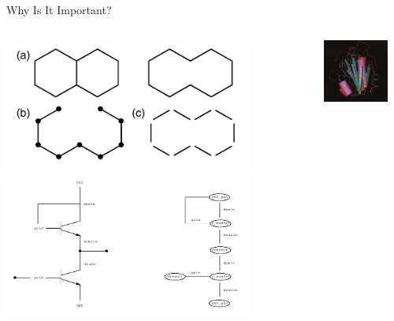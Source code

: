 \documentclass{beamer}
\begin{document}
\begin{frame}{Why Is It Important?}
  \begin{columns}[t]
    \begin{column}{0.5\textwidth}
      \centering
      \includegraphics[width=0.8\textwidth]{chemistry.png}
      \includegraphics[width=0.8\textwidth]{electronics.png}
    \end{column}
    \begin{column}{0.5\textwidth}
      \centering
      \includegraphics[width=0.8\textwidth]{proteins.png}

\end{column}
\end{columns}
\end{frame}
\end{document}
